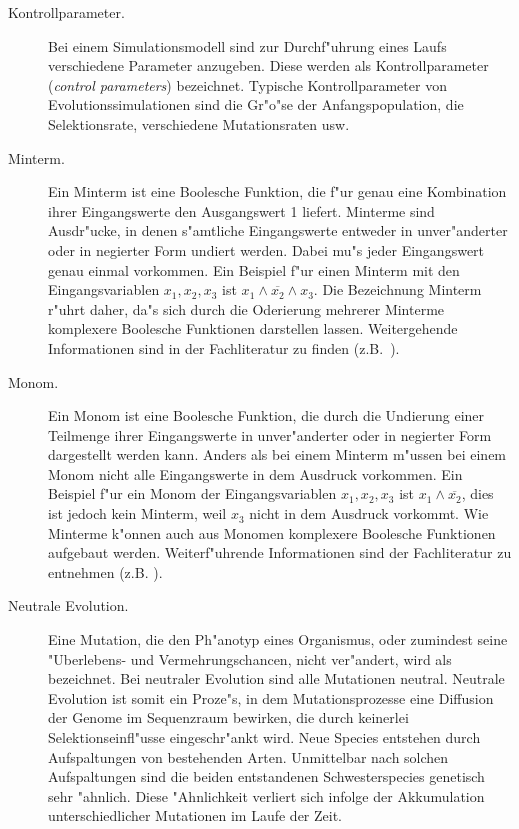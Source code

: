 \begin{description}








\item[Kontrollparameter.] Bei einem Simulationsmodell sind zur Durchf"uhrung eines
Laufs verschiedene Parameter anzugeben. Diese werden als Kontrollparameter ({\slshape control parameters})
bezeichnet. Typische Kontrollparameter von Evolutionssimulationen sind die Gr"o"se der Anfangspopulation,
die Selektionsrate, verschiedene Mutationsraten usw.

\item[Minterm.] Ein Minterm ist eine Boolesche Funktion, die f"ur genau eine Kombination ihrer Eingangswerte
den Ausgangswert 1 liefert. Minterme sind Ausdr"ucke, in denen s"amtliche Eingangswerte entweder in unver"anderter
oder in negierter Form undiert werden. Dabei mu"s jeder Eingangswert genau einmal vorkommen.
Ein Beispiel f"ur einen Minterm mit den Eingangsvariablen $x_1, x_2, x_3$ ist
$x_1 \wedge \overline{x_2} \wedge x_3$. Die Bezeichnung Minterm r"uhrt daher, da"s sich durch die Oderierung
mehrerer Minterme komplexere Boolesche Funktionen darstellen lassen. Weitergehende Informationen sind in
der Fachliteratur zu finden (z.B.\ \cite{Oberschelp92,Schmidt77}).

\item[Monom.] Ein Monom ist eine Boolesche Funktion, die durch die Undierung einer Teilmenge ihrer
Eingangswerte in unver"anderter oder in negierter Form dargestellt werden kann. Anders als bei einem
Minterm m"ussen bei einem Monom nicht alle Eingangswerte in dem Ausdruck vorkommen. Ein Beispiel
f"ur ein Monom der Eingangsvariablen $x_1, x_2, x_3$ ist $x_1 \wedge \overline{x_2}$, dies ist
jedoch kein Minterm, weil $x_3$ nicht in dem Ausdruck vorkommt. Wie Minterme k"onnen auch aus Monomen
komplexere Boolesche Funktionen aufgebaut werden. Weiterf"uhrende Informationen sind der Fachliteratur
zu entnehmen (z.B. \cite{Schmidt77}).

\item[Neutrale Evolution.] Eine Mutation, die den Ph"anotyp eines Organismus, oder zumindest seine "Uber\-le\-bens-
und Vermehrungschancen, nicht ver"andert, wird als  bezeichnet. Bei neutraler
Evolution sind alle Mutationen neutral. Neutrale Evolution ist somit ein Proze"s, in dem Mutationsprozesse
eine Diffusion der Genome im Sequenzraum bewirken, die durch keinerlei Selektionseinfl"usse eingeschr"ankt
wird. Neue Species entstehen durch Aufspaltungen von bestehenden Arten. Unmittelbar nach solchen Aufspaltungen
sind die beiden entstandenen Schwesterspecies genetisch sehr "ahnlich. Diese "Ahnlichkeit verliert sich infolge
der Akkumulation unterschiedlicher Mutationen im Laufe der Zeit.


\end{description}
